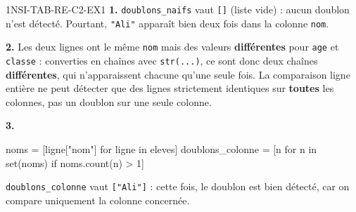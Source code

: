 \begin{corrige}{1NSI-TAB-RE-C2-EX1}
\textbf{1.} \lstinline{doublons_naifs} vaut \lstinline{[]} (liste vide) : aucun doublon
n'est détecté. Pourtant, \lstinline{"Ali"} apparaît bien deux fois dans la colonne
\lstinline{nom}.

\textbf{2.} Les deux lignes ont le même \lstinline{nom} mais des valeurs
\textbf{différentes} pour \lstinline{age} et \lstinline{classe} : converties en chaînes
avec \lstinline{str(...)}, ce sont donc deux chaînes \textbf{différentes}, qui n'apparaissent
chacune qu'une seule fois. La comparaison ligne entière ne peut détecter que des lignes
strictement identiques sur \textbf{toutes} les colonnes, pas un doublon sur une seule
colonne.

\textbf{3.}
\begin{python}
noms = [ligne["nom"] for ligne in eleves]
doublons_colonne = [n for n in set(noms) if noms.count(n) > 1]
\end{python}
\lstinline{doublons_colonne} vaut \lstinline{["Ali"]} : cette fois, le doublon est bien
détecté, car on compare uniquement la colonne concernée.
\end{corrige}
